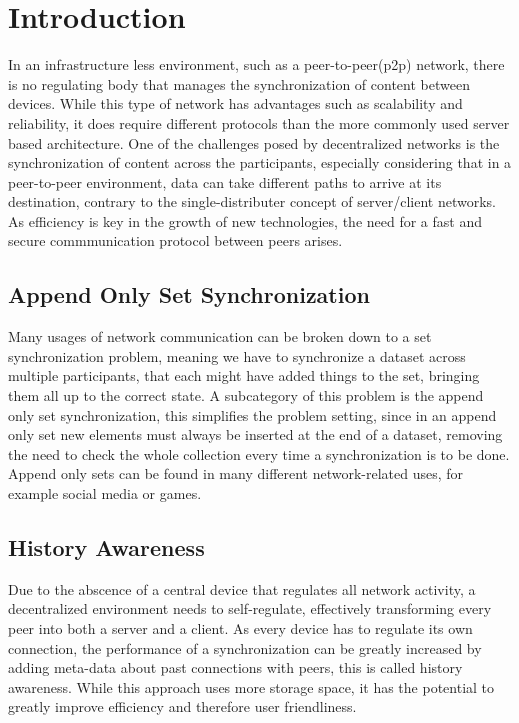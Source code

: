 \chapter{Introduction}

In an infrastructure less environment, such as a peer-to-peer(p2p) network, there is no regulating body that manages the synchronization of content between devices. While this type of network has advantages such as scalability and reliability, it does require different protocols than the more commonly used server based architecture. One of the challenges posed by decentralized networks is the synchronization of content across the participants, especially considering that in a peer-to-peer environment, data can take different paths to arrive at its destination, contrary to the single-distributer concept of server/client networks. As efficiency is key in the growth of new technologies, the need for a fast and secure commmunication protocol between peers arises. 

\section{Append Only Set Synchronization}

Many usages of network communication can be broken down to a set synchronization problem, meaning we have to synchronize a dataset across multiple participants, that each might have added things to the set, bringing them all up to the correct state. A subcategory of this problem is the append only set synchronization, this simplifies the problem setting, since in an append only set new elements must always be inserted at the end of a dataset, removing the need to check the whole collection every time a synchronization is to be done. Append only sets can be found in many different network-related uses, for example social media or games.

\section{History Awareness}

Due to the abscence of a central device that regulates all network activity, a decentralized environment needs to self-regulate, effectively transforming every peer into both a server and a client. As every device has to regulate its own connection, the performance of a synchronization can be greatly increased by adding meta-data about past connections with peers, this is called history awareness. While this approach uses more storage space, it has the potential to greatly improve efficiency and therefore user friendliness.

